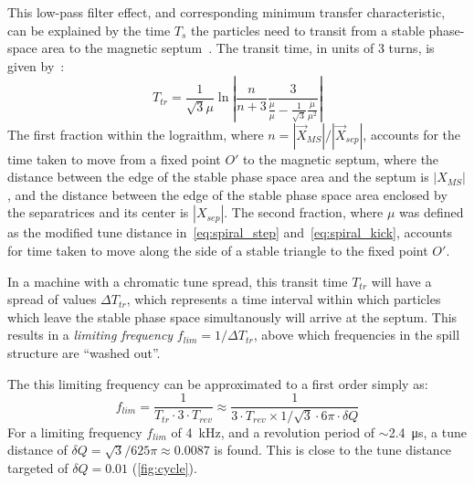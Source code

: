 \documentclass[11pt]{report}
\begin{document}
This low-pass filter effect, and corresponding minimum transfer characteristic, can be explained by the time $T_s$ the particles need to transit from a stable phase-space area to the magnetic septum~\cite{Sorge_2018}. The transit time, in units of 3 turns, is given by~\cite{Pullia:313678}:
\begin{equation}
  T_{tr} = \frac 1{\sqrt{3}\mu} \ln \left| \frac n{n+3} \frac 3{\frac {\dot \mu}\mu - \frac 1{\sqrt 3}\frac{\dot\mu}{\mu^2}}\right|
  \label{eq:transit_time}
\end{equation} 
The first fraction within the lograithm, where $n=|\vec X_{MS}|/|\vec X_{sep}|$, accounts for the time taken to move from a fixed point $O'$ to the magnetic septum, where the distance between the edge of the stable phase space area and the septum is $|X_{MS}|$, and the distance between the edge of the stable phase space area enclosed by the separatrices and its center is $|X_{sep}|$. The second fraction, where $\mu$ was defined as the modified tune distance in~\autoref{eq:spiral_step} and~\autoref{eq:spiral_kick}, accounts for time taken to move along the side of a stable triangle to the fixed point $O'$.

In a machine with a chromatic tune spread, this transit time $T_{tr}$ will have a spread of values $\Delta T_{tr}$, which represents a time interval within which particles which leave the stable phase space simultanously will arrive at the septum. This results in a \textit{limiting frequency} $f_{lim}=1/\Delta T_{tr}$, above which frequencies in the spill structure are ``washed out''. 

The this limiting frequency can be approximated to a first order simply as:
\begin{equation}
  f_{lim} = \frac 1{T_{tr}\cdot 3\cdot T_{rev}} \approx \frac 1{3\cdot T_{rev}\times 1/\sqrt{3}\cdot 6\pi\cdot\delta Q}
\end{equation}
For a limiting frequency $f_{lim}$ of \qty{4}{\kilo\hertz}, and a revolution period of $\sim$\qty{2.4}{\micro\second}, a tune distance of $\delta Q=\sqrt{3}/625\pi\approx 0.0087$ is found. This is close to the tune distance targeted of $\delta Q=0.01$ (\autoref{fig:cycle}).
\end{document}
